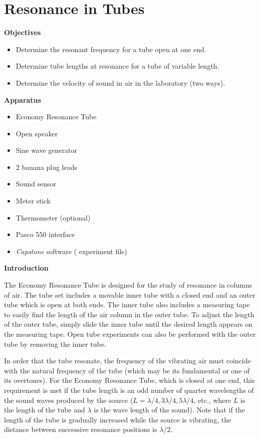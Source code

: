 \section{Resonance in Tubes}

\makelabheader %

\bigskip

\textbf{Objectives}
\begin{itemize}[nosep]
\item Determine the resonant frequency for a tube open at one end.

\item Determine tube lengths at resonance for a tube of variable length.

\item Determine the velocity of sound in air in the laboratory (two ways).

\end{itemize}

\bigskip
\textbf{Apparatus} 
\begin{itemize}[nosep]

\item Economy Resonance Tube 
\item Open speaker
\item Sine wave generator
\item 2 banana plug leads
\item Sound sensor
\item Meter stick
\item Thermometer (optional)
\item Pasco 550 interface
\item \textit{Capstone} software ( experiment file)

\end{itemize}
\bigskip
\textbf{Introduction} 

The Economy Resonance Tube is designed for the study of resonance in columns of air.  The tube set includes a movable inner tube with a closed end and an outer tube which is open at both ends.  The inner tube also includes a measuring tape to easily find the length of the air column in the outer tube.  To adjust the length of the outer tube, simply slide the inner tube until the desired length appears on the measuring tape.  Open tube experiments can also be performed with the outer tube by removing the inner tube.

In order that the tube resonate, the frequency of the vibrating air must coincide with the natural frequency of the tube (which may be its fundamental or one of its overtones). For the Economy Resonance Tube, which is closed at one end, this requirement is met if the tube length is an odd number of quarter wavelengths of the sound waves produced by the source ($L = \lambda/4, 3 \lambda/4, 5 \lambda/4$, etc., where $L$ is the length of the tube and $\lambda$ is the wave length of the sound). Note that if the length of the tube is gradually increased while the source is vibrating, the distance between successive resonance positions is $\lambda/2$. 


